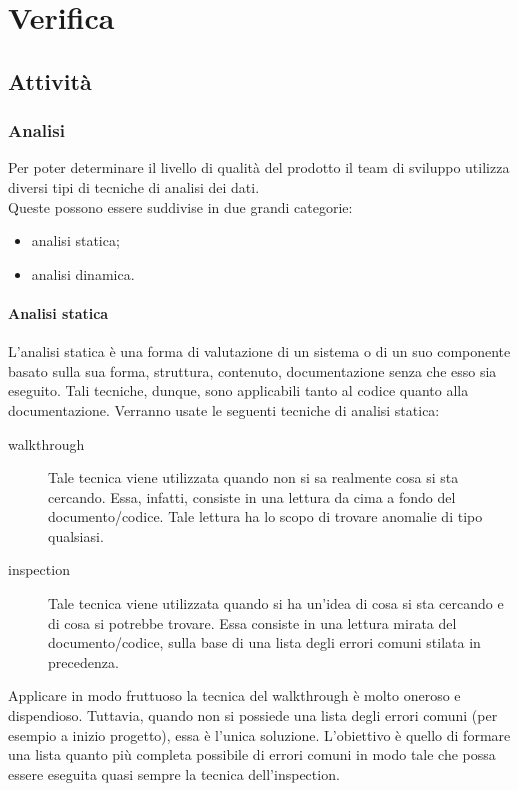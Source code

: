 \section{Verifica}
	\subsection{Attività}
		\subsubsection{Analisi}
			Per poter determinare il livello di qualità del prodotto il team di sviluppo utilizza diversi tipi di tecniche di analisi dei dati.\\
			Queste possono essere suddivise in due grandi categorie:
			\begin{itemize}
				\item analisi statica;
				\item analisi dinamica.
			\end{itemize}
			\paragraph{Analisi statica}
				L'analisi statica è una forma di valutazione di un sistema o di un suo componente basato sulla sua forma, struttura, contenuto, 
				documentazione senza che esso sia eseguito. Tali tecniche, dunque, sono applicabili tanto al codice quanto alla documentazione.
				Verranno usate le seguenti tecniche di analisi statica:
				\begin{description}
					\item[walkthrough] Tale tecnica viene utilizzata quando non si sa realmente cosa si sta cercando. Essa, infatti, consiste in una 
					lettura da cima a fondo del documento/codice. Tale lettura ha lo scopo di trovare anomalie di tipo qualsiasi.
					\item[inspection] Tale tecnica viene utilizzata quando si ha un'idea di cosa si sta cercando e di cosa si potrebbe trovare. Essa 
					consiste in una lettura mirata del documento/codice, sulla base di una lista degli errori comuni stilata in precedenza.
				\end{description}
				Applicare in modo fruttuoso la tecnica del walkthrough è molto oneroso e dispendioso. Tuttavia, quando non si possiede una lista degli
				errori comuni (per esempio a inizio progetto), essa è l'unica soluzione. L'obiettivo è quello di formare una lista quanto più completa 
				possibile di errori comuni in modo tale che possa essere eseguita quasi sempre la tecnica dell'inspection.
